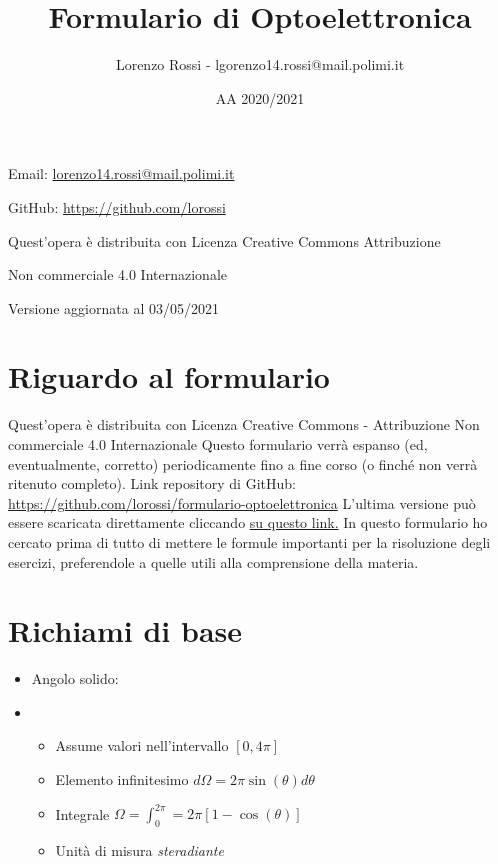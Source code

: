\documentclass{article}
\title{Formulario di Optoelettronica}
\author{Lorenzo Rossi - lgorenzo14.rossi@mail.polimi.it}
\date{AA 2020/2021}
\begin{document}
\maketitle

\vspace{18em}

\large
\begin{doublespacing}\hypersetup{
    urlcolor=black,
  }
  \centerline{Email: \href{mailto://lorenzo14.rossi@mail.polimi.it}{lorenzo14.rossi@mail.polimi.it}}
  \centerline{GitHub: \url{https://github.com/lorossi}}

  \vspace{18em}
  \centerline{Quest'opera è distribuita con Licenza Creative Commons Attribuzione}
  \centerline{Non commerciale 4.0 Internazionale \ccbynceu}
  \centerline{Versione aggiornata al 03/05/2021}
\end{doublespacing}
\newpage


\tableofcontents
\clearpage
{}
\newpage

\section{Riguardo al formulario}
Quest'opera è distribuita con Licenza Creative Commons - Attribuzione Non commerciale 4.0 Internazionale \ccbynceu \newline
Questo formulario verrà espanso (ed, eventualmente, corretto) periodicamente fino a fine corso (o finché non verrà ritenuto completo). \newline
Link repository di GitHub: \url{https://github.com/lorossi/formulario-optoelettronica} \newline
L'ultima versione può essere scaricata direttamente cliccando \href{https://github.com/lorossi/formulario-optoelettronica/raw/master/formulario-optoelettronica.pdf}{su questo link.} \newline
In questo formulario ho cercato prima di tutto di mettere le formule importanti per la risoluzione degli esercizi, preferendole a quelle utili alla comprensione della materia.

\section{Richiami di base}
\begin{itemize}
  \item Angolo solido:
  \item \begin{itemize}
          \item Assume valori nell'intervallo \( [0, 4 \pi] \)
          \item Elemento infinitesimo \( d \Omega = 2 \pi \sin(\theta) d \theta \)
          \item Integrale \( \displaystyle \Omega = \int_0^{2 \pi} = 2 \pi \left[  1- \cos(\theta) \right] \)
          \item Unità di misura \textit{steradiante}
        \end{itemize}
\end{itemize}
\end{document}
